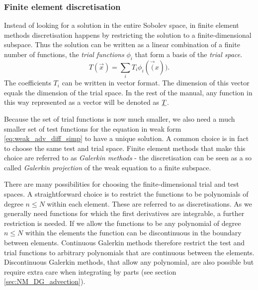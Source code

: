 \subsubsection{Finite element discretisation}
Instead of looking for a solution in the entire Sobolev space,
in finite element methods discretisation
happens by restricting the solution to a 
finite-dimensional subspace. Thus the solution can be 
written as a linear combination of a finite number of functions,
the \emph{trial functions} $\phi_i$ that form a basis of the 
\emph{trial space}.
\begin{equation*}
  T(\vec{x})=\sum_i T_i \phi_i(\vec(x)).
\end{equation*}
The coefficients $T_i$ can be written in vector format. The 
dimension of this vector equals the dimension of the trial 
space. In the rest of the manual, any function in 
this way represented as a vector will be denoted as $\underline{T}$.

Because the set of trial functions is now much smaller, we also need
a much smaller set of test functions for the equation in weak 
form \eqref{eq:weak_adv_diff_simp} to have a unique 
solution. A common choice is in fact to choose the same
test and trial space. Finite element methods that make this choice are 
referred to as \emph{Galerkin methods} - the discretisation 
can be seen as a so called \emph{Galerkin 
projection} of the weak equation to a finite subspace.

There are many possibilities for choosing the finite-dimensional trial and test spaces. 
A straightforward choice is to restrict the functions to be polynomials of degree 
$n\leq N$ within each element. These are referred to as \PN discretisations. 
As we generally need functions for which the first 
derivatives are integrable, a further restriction 
is needed. If we allow the functions to be any polynomial of 
degree $n\leq N$ within the elements the function can be 
discontinuous in the boundary between elements. 
Continuous Galerkin methods therefore
restrict the test and trial functions to arbitrary polynomials 
that are continuous between the elements. Discontinuous Galerkin methods, 
that allow any polynomial, are also possible but require 
extra care when integrating by parts (see section \ref{sec:NM_DG_advection}).

